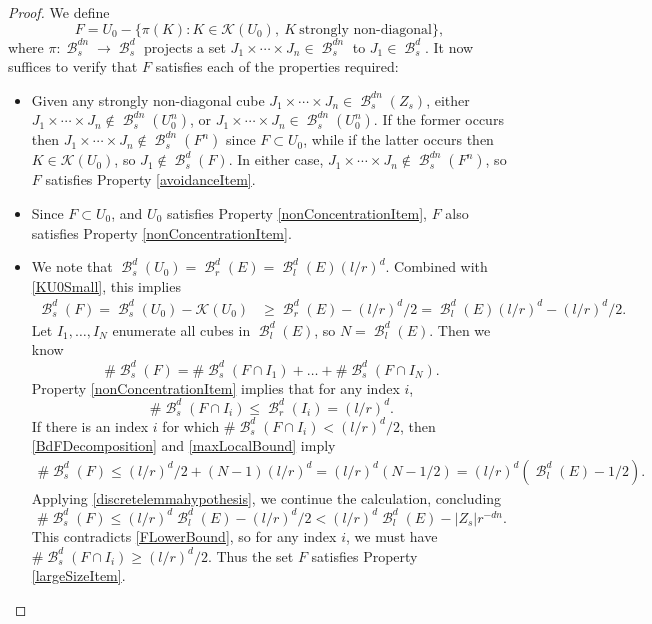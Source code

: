 \documentclass[dvipsnames,letterpaper,12pt]{article}
\numberwithin{equation}{section}
\theoremstyle{plain}
\DeclareMathOperator{\B}{\mathcal{B}}
\begin{document}
\begin{proof}
	We define
	\begin{equation}\label{defnOfF}
		F = U_0 - \{ \pi(K)\colon K\in \mathcal{K}(U_0),\ K\ \textrm{strongly non-diagonal} \},
	\end{equation} 
	where $\pi\colon \B_s^{dn}\to \B_s^d$ projects a set $J_1\times\cdots\times J_n \in \B_s^{dn}$ to $J_1 \in \B_s^d$. It now suffices to verify that $F$ satisfies each of the properties required:
	\begin{itemize}
		\item Given any strongly non-diagonal cube $J_1 \times \cdots \times J_n \in \B_s^{dn}(Z_s)$, either $J_1 \times \cdots \times J_n \not \in \B_s^{dn}(U_0^n)$, or $J_1 \times \cdots \times J_n \in \B_s^{dn}(U_0^n)$. If the former occurs then $J_1 \times \cdots \times J_n \not \in \B_s^{dn}(F^n)$ since $F\subset U_0$, while if the latter occurs then $K \in \mathcal{K}(U_0)$, so $J_1 \not \in \B_s^d(F)$. In either case, $J_1 \times \cdots \times J_n \not \in \B_s^{dn}(F^n)$, so $F$ satisfies Property \ref{avoidanceItem}.

		\item Since $F\subset U_0$, and $U_0$ satisfies Property \ref{nonConcentrationItem}, $F$ also satisfies Property \ref{nonConcentrationItem}.

		\item We note that $\B^d_s(U_0) = \B^d_r(E) = \B^d_l(E) (l/r)^d$. Combined with \eqref{KU0Small}, this implies
		\begin{equation} \label{FLowerBound}
		\begin{split}
			\B^d_s(F) = \B^d_s(U_0) - \mathcal{K}(U_0) &\geq \B^d_r(E) - (l/r)^d/2 = \B^d_l(E) (l/r)^d - (l/r)^d/2.
		\end{split}
		\end{equation}
		Let $I_1, \dots, I_N$ enumerate all cubes in $\B^d_l(E)$, so $N = \B^d_l(E)$. Then we know
		\begin{equation} \label{BdFDecomposition}
			\# \B^d_s(F) = \# \B^d_s(F \cap I_1) + \dots + \# \B^d_s(F \cap I_N).
		\end{equation}
		Property \ref{nonConcentrationItem} implies that for any index $i$,
		\begin{equation} \label{maxLocalBound}
			\# \B^d_s(F \cap I_i) \leq \B^d_r(I_i) = (l/r)^d.
		\end{equation}
		If there is an index $i$ for which $\# \B^d_s(F \cap I_i) < (l/r)^d/2$, then \eqref{BdFDecomposition} and \eqref{maxLocalBound} imply
		\begin{align*}
			\# \B^d_s(F) \leq (l/r)^d/2 + (N - 1)(l/r)^d = (l/r)^d(N - 1/2) = (l/r)^d(\B^d_l(E) - 1/2).
		\end{align*}
		Applying \eqref{discretelemmahypothesis}, we continue the calculation, concluding
		\[ \# \B^d_s(F) \leq (l/r)^d \B^d_l(E) - (l/r)^d/2 < (l/r)^d \B^d_l(E) - |Z_s| r^{-dn}. \]
		This contradicts \eqref{FLowerBound}, so for any index $i$, we must have $\# \B^d_s(F \cap I_i) \geq (l/r)^d/2$. Thus the set $F$ satisfies Property \ref{largeSizeItem}. \qedhere
	\end{itemize}
\end{proof}
\end{document}
